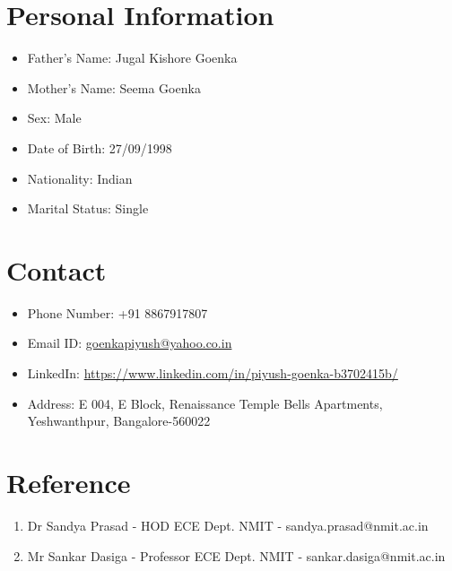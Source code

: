 \documentclass[12pt,a4paper,sans]{moderncv} %
\begin{document}
\section{Personal Information}

\begin{itemize}
	
	
	\item Father's Name: Jugal Kishore Goenka
	\item Mother's Name: Seema Goenka
	\item Sex: Male
	\item Date of Birth: 27/09/1998
	\item Nationality: Indian
	\item Marital Status: Single
\end{itemize}



\section{Contact}
\begin{itemize}
	\item Phone Number: +91 8867917807
	\item Email ID: \url{goenkapiyush@yahoo.co.in}
	\item LinkedIn: \url{https://www.linkedin.com/in/piyush-goenka-b3702415b/}
	\item Address: E 004, E Block, Renaissance Temple Bells Apartments, Yeshwanthpur, Bangalore-560022
	
\end{itemize}


\section{Reference}
\begin{enumerate}
	\item Dr Sandya Prasad - HOD ECE Dept. NMIT - sandya.prasad@nmit.ac.in
	\item Mr Sankar Dasiga - Professor ECE Dept. NMIT - sankar.dasiga@nmit.ac.in
	
\end{enumerate}
\end{document}
